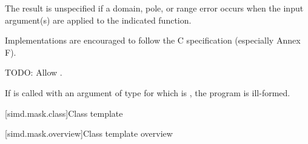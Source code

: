 \pnum
The result is unspecified if a domain, pole, or range error occurs when the input argument(s) are applied to the indicated  function.
\begin{note}Implementations are encouraged to follow the C specification (especially Annex F).\end{note}

\pnum
TODO: Allow .

\pnum
If  is called with an argument of type  for which  is , the program is ill-formed.

[simd.mask.class]{Class template }

[simd.mask.overview]{Class template  overview}


